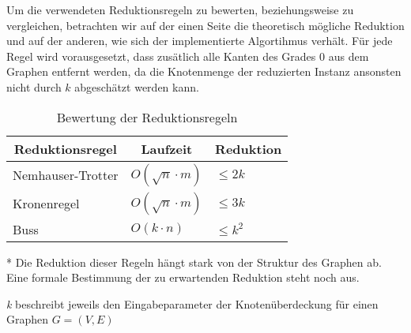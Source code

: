 Um die verwendeten Reduktionsregeln zu bewerten, beziehungsweise zu vergleichen, betrachten wir auf der einen Seite die theoretisch mögliche Reduktion und auf der anderen, wie sich der implementierte Algortihmus verhält. Für jede Regel wird vorausgesetzt, dass zusätlich alle Kanten des Grades 0 aus dem Graphen entfernt werden, da die Knotenmenge der reduzierten Instanz ansonsten nicht durch $k$ abgeschätzt werden kann.



\begin{table}[htb]
\caption{Bewertung der Reduktionsregeln\label{tab:liste}}
\vspace*{1em}
\centering

\bgroup
\def\arraystretch{1.3}%

\begin{threeparttable}

\begin{tabular}[c]{lll}
	\hline
	\multicolumn{1}{c}{\textbf{Reduktionsregel}} & 
	\multicolumn{1}{c}{\textbf{Laufzeit}} & 
	\multicolumn{1}{c}{\textbf{Reduktion}} \\ 
	
	\hline

	Nemhauser-Trotter&$O(\sqrt{n} \cdot m)$&  $\leq 2k$\\
	Kronenregel&$O(\sqrt{n} \cdot m)$ & $\leq 3k$\\
	Buss&$O(k \cdot n)$  & $\leq k^{2}$\\
	\hline
\end{tabular}

\begin{tablenotes}\footnotesize
\item[*] Die Reduktion dieser Regeln hängt stark von der Struktur des Graphen ab. Eine formale Bestimmung der zu erwartenden Reduktion steht noch aus.
\item \emph{k} beschreibt jeweils den Eingabeparameter der Knotenüberdeckung für einen Graphen $G=(V,E)$
\end{tablenotes}

\end{threeparttable}

\egroup

\end{table}

